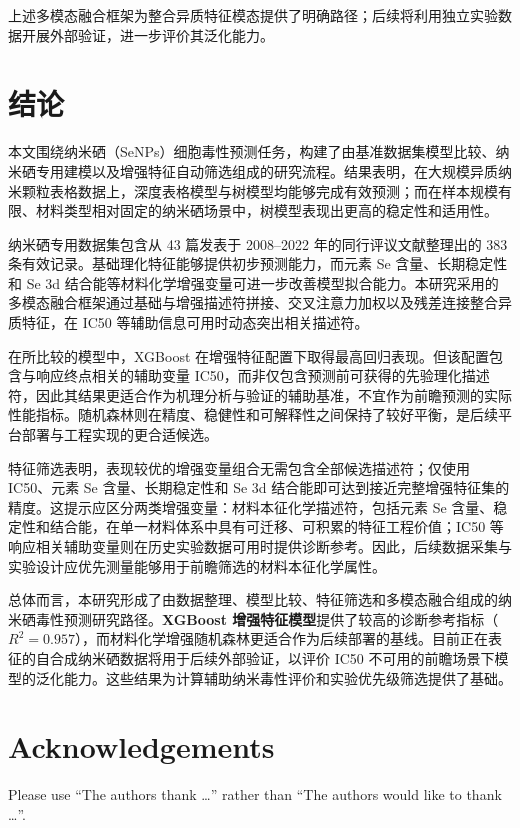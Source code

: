 \documentclass[letterpaper]{article}
\begin{document}
上述多模态融合框架为整合异质特征模态提供了明确路径；后续将利用独立实验数据开展外部验证，进一步评价其泛化能力。

\section{结论}

本文围绕纳米硒（SeNPs）细胞毒性预测任务，构建了由基准数据集模型比较、纳米硒专用建模以及增强特征自动筛选组成的研究流程。结果表明，在大规模异质纳米颗粒表格数据上，深度表格模型与树模型均能够完成有效预测；而在样本规模有限、材料类型相对固定的纳米硒场景中，树模型表现出更高的稳定性和适用性。

纳米硒专用数据集包含从 43 篇发表于 2008--2022 年的同行评议文献整理出的 383 条有效记录。基础理化特征能够提供初步预测能力，而元素 Se 含量、长期稳定性和 Se 3d 结合能等材料化学增强变量可进一步改善模型拟合能力。本研究采用的多模态融合框架通过基础与增强描述符拼接、交叉注意力加权以及残差连接整合异质特征，在 IC50 等辅助信息可用时动态突出相关描述符。

在所比较的模型中，XGBoost 在增强特征配置下取得最高回归表现。但该配置包含与响应终点相关的辅助变量 IC50，而非仅包含预测前可获得的先验理化描述符，因此其结果更适合作为机理分析与验证的辅助基准，不宜作为前瞻预测的实际性能指标。随机森林则在精度、稳健性和可解释性之间保持了较好平衡，是后续平台部署与工程实现的更合适候选。

特征筛选表明，表现较优的增强变量组合无需包含全部候选描述符；仅使用 IC50、元素 Se 含量、长期稳定性和 Se 3d 结合能即可达到接近完整增强特征集的精度。这提示应区分两类增强变量：材料本征化学描述符，包括元素 Se 含量、稳定性和结合能，在单一材料体系中具有可迁移、可积累的特征工程价值；IC50 等响应相关辅助变量则在历史实验数据可用时提供诊断参考。因此，后续数据采集与实验设计应优先测量能够用于前瞻筛选的材料本征化学属性。

总体而言，本研究形成了由数据整理、模型比较、特征筛选和多模态融合组成的纳米硒毒性预测研究路径。\textbf{XGBoost 增强特征模型}提供了较高的诊断参考指标（$R^2=0.957$），而材料化学增强随机森林更适合作为后续部署的基线。目前正在表征的自合成纳米硒数据将用于后续外部验证，以评价 IC50 不可用的前瞻场景下模型的泛化能力。这些结果为计算辅助纳米毒性评价和实验优先级筛选提供了基础。


\section*{Acknowledgements}

Please use ``The authors thank \ldots'' rather than ``The authors would like to
thank \ldots''.
\end{document}
